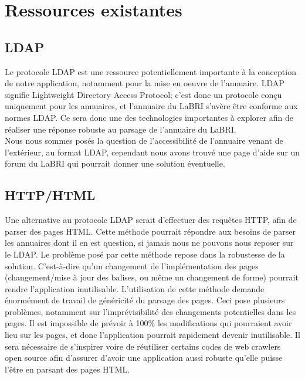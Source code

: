 \documentclass [pdftex,12pt] {report}
\begin{document}
\section{Ressources existantes}

\subsection{LDAP}
Le protocole LDAP est une ressource potentiellement importante à la conception de notre application, notamment pour la mise en oeuvre de l'annuaire. LDAP signifie Lightweight Directory Access Protocol; c'est donc un protocole conçu uniquement pour les annuaires, et l'annuaire du LaBRI s'avère être conforme aux normes LDAP.
Ce sera donc une des technologies importantes à explorer afin de réaliser une réponse robuste au parsage de l'annuaire du LaBRI.\\
Nous nous sommes posés la question de l'accessibilité de l'annuaire venant de l'extérieur, au format LDAP, cependant nous avons trouvé une page d'aide sur un forum du LaBRI\cite{labriForum} qui pourrait donner une solution éventuelle.

\subsection{HTTP/HTML}
Une alternative au protocole LDAP serait d'effectuer des requêtes HTTP, afin de parser des pages HTML. Cette méthode pourrait répondre aux besoins de parser les annuaires dont il en est question, si jamais nous ne pouvons nous reposer sur le LDAP. Le problème posé par cette méthode repose dans la robustesse de la solution. C'est-à-dire qu'un changement de l'implémentation des pages (changement/mise à jour des balises, ou même un changement de forme) pourrait rendre l'application inutilisable. L'utilisation de cette méthode demande énormément de travail de généricité du parsage des pages.
Ceci pose plusieurs problèmes, notamment sur l'imprévisibilité des changements potentielles dans les pages. Il est impossible de prévoir à 100\% les modifications qui pourraient avoir lieu sur les pages, et donc l'application pourrait rapidement devenir inutilisable. Il sera nécessaire de s'inspirer voire de réutiliser certains codes de web crawlers open source afin d'assurer d'avoir une application aussi robuste qu'elle puisse l'être en parsant des pages HTML.
\end{document}
